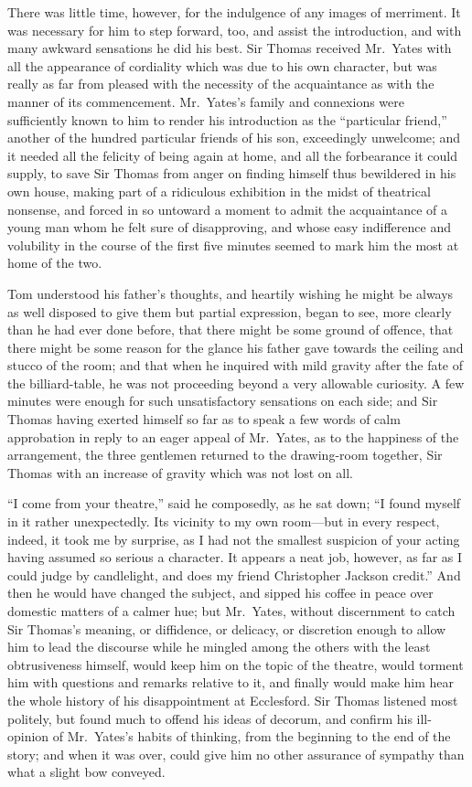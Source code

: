 \documentclass{article}
\begin{document}
There was little time, however, for the indulgence
of any images of merriment.  It was necessary for him
to step forward, too, and assist the introduction,
and with many awkward sensations he did his best.
Sir Thomas received Mr.\ Yates with all the appearance
of cordiality which was due to his own character,
but was really as far from pleased with the necessity of
the acquaintance as with the manner of its commencement.
Mr.\ Yates's family and connexions were sufficiently known
to him to render his introduction as the ``particular friend,''
another of the hundred particular friends of his son,
exceedingly unwelcome; and it needed all the felicity of being
again at home, and all the forbearance it could supply,
to save Sir Thomas from anger on finding himself thus
bewildered in his own house, making part of a ridiculous
exhibition in the midst of theatrical nonsense, and forced
in so untoward a moment to admit the acquaintance of a young
man whom he felt sure of disapproving, and whose easy
indifference and volubility in the course of the first
five minutes seemed to mark him the most at home of the two.

Tom understood his father's thoughts, and heartily
wishing he might be always as well disposed to give them
but partial expression, began to see, more clearly than
he had ever done before, that there might be some ground
of offence, that there might be some reason for the glance
his father gave towards the ceiling and stucco of the room;
and that when he inquired with mild gravity after the fate
of the billiard-table, he was not proceeding beyond
a very allowable curiosity.  A few minutes were enough
for such unsatisfactory sensations on each side; and Sir
Thomas having exerted himself so far as to speak a few
words of calm approbation in reply to an eager appeal
of Mr.\ Yates, as to the happiness of the arrangement,
the three gentlemen returned to the drawing-room together,
Sir Thomas with an increase of gravity which was not
lost on all.

``I come from your theatre,'' said he composedly, as he
sat down; ``I found myself in it rather unexpectedly.
Its vicinity to my own room---but in every respect, indeed,
it took me by surprise, as I had not the smallest suspicion
of your acting having assumed so serious a character.
It appears a neat job, however, as far as I could judge
by candlelight, and does my friend Christopher Jackson credit.''
And then he would have changed the subject, and sipped
his coffee in peace over domestic matters of a calmer hue;
but Mr.\ Yates, without discernment to catch Sir Thomas's meaning,
or diffidence, or delicacy, or discretion enough to allow
him to lead the discourse while he mingled among the others
with the least obtrusiveness himself, would keep him on
the topic of the theatre, would torment him with questions
and remarks relative to it, and finally would make him hear
the whole history of his disappointment at Ecclesford.
Sir Thomas listened most politely, but found much to
offend his ideas of decorum, and confirm his ill-opinion
of Mr.\ Yates's habits of thinking, from the beginning
to the end of the story; and when it was over, could give
him no other assurance of sympathy than what a slight bow conveyed.
\end{document}
